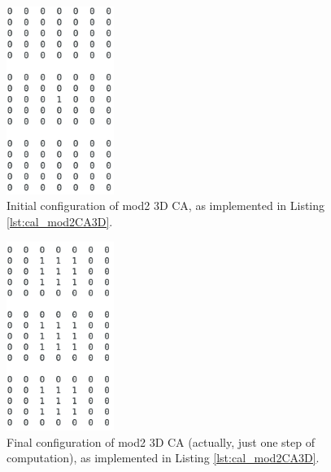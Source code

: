 \begin{figure}
  \begin{center}
    \includegraphics[width=3.5cm]{./images/OpenCAL/mod2_0000}
    \caption{Initial configuration of mod2 3D CA, as implemented in Listing \ref{lst:cal_mod2CA3D}.}
    \label{fig:mod2_0000}
  \end{center}
\end{figure}

\begin{figure}
  \begin{center}
    \includegraphics[width=3.5cm]{./images/OpenCAL/mod2_LAST}
    \caption{Final configuration of mod2 3D CA (actually, just one step of computation), as implemented in Listing \ref{lst:cal_mod2CA3D}.}
    \label{fig:mod2_LAST}
  \end{center}
\end{figure}


